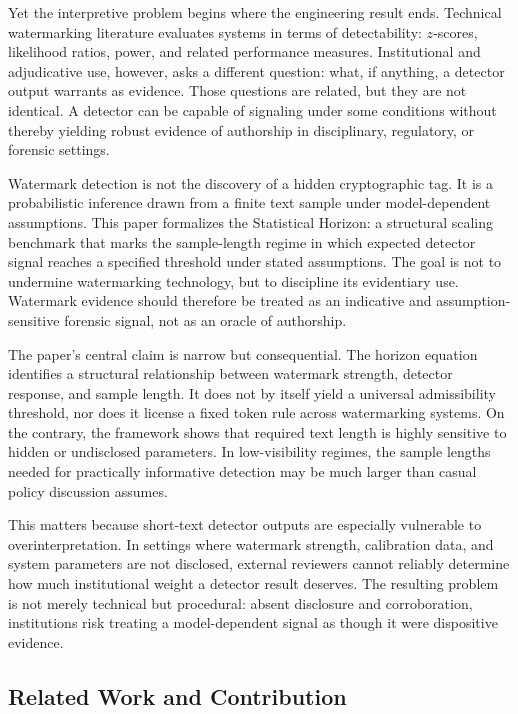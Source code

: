 \documentclass[11pt]{article}
\begin{document}
Yet the interpretive problem begins where the engineering result ends. Technical
watermarking literature evaluates systems in terms of detectability: $z$-scores,
likelihood ratios, power, and related performance measures. Institutional and
adjudicative use, however, asks a different question: what, if anything, a
detector output warrants as evidence. Those questions are related, but they are
not identical. A detector can be capable of signaling under some conditions
without thereby yielding robust evidence of authorship in disciplinary,
regulatory, or forensic settings.

Watermark detection is not the discovery of a hidden cryptographic tag. It is a
probabilistic inference drawn from a finite text sample under model-dependent
assumptions. This paper formalizes the Statistical Horizon: a structural scaling
benchmark that marks the sample-length regime in which expected detector signal
reaches a specified threshold under stated assumptions. The goal is not to
undermine watermarking technology, but to discipline its evidentiary use.
Watermark evidence should therefore be treated as an indicative and
assumption-sensitive forensic signal, not as an oracle of authorship.

The paper's central claim is narrow but consequential. The horizon equation
identifies a structural relationship between watermark strength, detector
response, and sample length. It does not by itself yield a universal admissibility
threshold, nor does it license a fixed token rule across watermarking systems. On
the contrary, the framework shows that required text length is highly sensitive to
hidden or undisclosed parameters. In low-visibility regimes, the sample lengths
needed for practically informative detection may be much larger than casual policy
discussion assumes.

This matters because short-text detector outputs are especially vulnerable to
overinterpretation. In settings where watermark strength, calibration data, and
system parameters are not disclosed, external reviewers cannot reliably determine
how much institutional weight a detector result deserves. The resulting problem is
not merely technical but procedural: absent disclosure and corroboration,
institutions risk treating a model-dependent signal as though it were dispositive
evidence.

\subsection{Related Work and Contribution}
\end{document}

